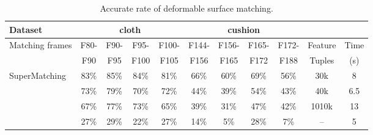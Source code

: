 \begin{table}[htb]
\centering
\tabcolsep=1pt
\setlength{\aboverulesep}{0pt}
\setlength{\belowrulesep}{0pt}
\caption{Accurate rate of deformable surface matching.}
\hspace{-5ex}
\label{tab:errorrate1}
\small
\begin{tabular}{l|c c c c | c c c c | c c}
\toprule
{Dataset}  & \multicolumn{4}{|c|}{ {cloth}} & \multicolumn{4}{c|}{ {cushion}} & & \\
\hline
 {Matching frames} &  {F80-}	&  {F90-}	& {F95-}	& {F100-} & {F144-} & {F156-}	& {F165-}	& {F172-} & {Feature}	& {Time}  \\
 {}                &  {F90 }    &  {F95 }   & {F100}    & {F105}  & {F156}  & {F165}    & {F172}    & {F188}  & {Tuples}    &  {(s)} \\
\hline
 {SuperMatching}   &  {83\%}    &  {85\%}	& {84\%} 	& {81\%}  & {66\%}	& {60\%}	& {69\%}	& {56\%}  &  {30k}	    &  {8}  \\
 {\cite{Zass08}}   & {73\%}	    & {79\%}	& {70\%}	& {72\%}  & {44\%}  & {39\%}    & {54\%}	& {43\%}   & {40k}	    & {6.5}  \\
{\cite{Duchenne09}} & {67\%}    & {77\%}    & {73\%}	& {65\%}  & {39\%}	& {31\%}	& {47\%}	& {42\%}   & {1010k}    & {13}  \\
 {\cite{Cour06}}   & {27\%}     & {29\%}	&  {22\%}	& {27\%}  & {14\%}  & {5\%}	    & {28\%}	& {7\%}    & {--}       & {5}  \\
\bottomrule
\end{tabular}%
\end{table}%
%

